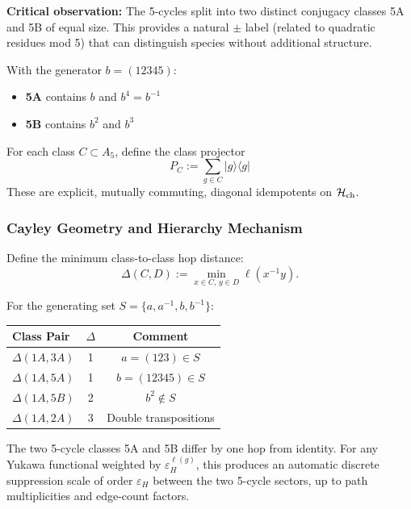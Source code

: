 \textbf{Critical observation:} The 5-cycles split into two distinct conjugacy classes 
5A and 5B of equal size. This provides a natural $\pm$ label (related to quadratic 
residues mod 5) that can distinguish species without additional structure.

With the generator $b = (12345)$:
\begin{itemize}
\item \textbf{5A} contains $b$ and $b^4 = b^{-1}$
\item \textbf{5B} contains $b^2$ and $b^3$
\end{itemize}

For each class $C \subset A_5$, define the class projector
\begin{equation}\label{eq:class-projector}
\boxed{P_C := \sum_{g \in C} |g\rangle\langle g|}
\end{equation}
These are explicit, mutually commuting, diagonal idempotents on $\mathcal{H}_{\rm ch}$.

\subsubsection{Cayley Geometry and Hierarchy Mechanism}

Define the minimum class-to-class hop distance:
\begin{equation}
\Delta(C, D) := \min_{x \in C,\, y \in D} \ell(x^{-1}y).
\end{equation}

For the generating set $S = \{a, a^{-1}, b, b^{-1}\}$:

\begin{center}
\renewcommand{\arraystretch}{1.3}
\begin{tabular}{lcc}
\toprule
Class Pair & $\Delta$ & Comment \\
\midrule
$\Delta(1A, 3A)$ & 1 & $a = (123) \in S$ \\
$\Delta(1A, 5A)$ & 1 & $b = (12345) \in S$ \\
$\Delta(1A, 5B)$ & 2 & $b^2 \notin S$ \\
$\Delta(1A, 2A)$ & 3 & Double transpositions \\
\bottomrule
\end{tabular}
\end{center}

\begin{proposition}\label{prop:cayley-hierarchy}
The two 5-cycle classes 5A and 5B differ by one hop from identity.
For any Yukawa functional weighted by $\varepsilon_H^{\ell(g)}$, this produces 
an automatic discrete suppression scale of order $\varepsilon_H$ between the 
two 5-cycle sectors, up to path multiplicities and edge-count factors.
\end{proposition}


